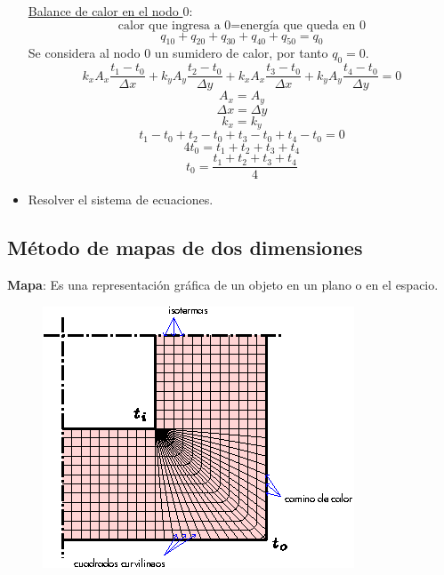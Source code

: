 \begin{itemize}
        \underline{Balance de calor en el nodo $0$}:
        \begin{equation*}
            \text{calor que ingresa a 0}=\text{energía que queda en 0}
        \end{equation*}
        \begin{equation*}
            q_{10}+q_{20}+q_{30}+q_{40}+q_{50}=q_0
        \end{equation*}
        Se considera al nodo $0$ un sumidero de calor, por tanto $q_0=0$.
        \begin{equation*}
            k_x A_x\frac{t_1-t_0}{\Delta x}+
            k_y A_y\frac{t_2-t_0}{\Delta y}+
            k_x A_x\frac{t_3-t_0}{\Delta x}+
            k_y A_y\frac{t_4-t_0}{\Delta y}=0
        \end{equation*}
        \begin{equation*}
            A_x=A_y
        \end{equation*}
        \begin{equation*}
            \Delta x=\Delta y
        \end{equation*}
        \begin{equation*}
            k_x=k_y
        \end{equation*}
        \begin{equation*}
            t_1-t_0+t_2-t_0+t_3-t_0+t_4-t_0=0
        \end{equation*}
        \begin{equation*}
            4t_0=t_1+t_2+t_3+t_4
        \end{equation*}
        \begin{equation*}
            t_0=\frac{t_1+t_2+t_3+t_4}{4}
        \end{equation*}
    \item Resolver el sistema de ecuaciones.
\end{itemize}

\subsection{Método de mapas de dos dimensiones}
\textbf{Mapa}: Es una representación gráfica de un objeto en un plano o en el
espacio.

\begin{figure}[!h]
\centering
\includegraphics[scale=1.60]{figura02_23.eps}
\end{figure}

